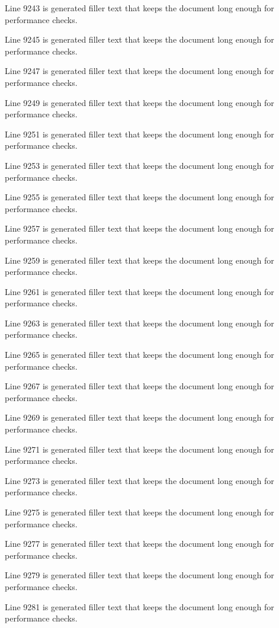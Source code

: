 Line 9243 is generated filler text that keeps the document long enough for performance checks.

Line 9245 is generated filler text that keeps the document long enough for performance checks.

Line 9247 is generated filler text that keeps the document long enough for performance checks.

Line 9249 is generated filler text that keeps the document long enough for performance checks.

Line 9251 is generated filler text that keeps the document long enough for performance checks.

Line 9253 is generated filler text that keeps the document long enough for performance checks.

Line 9255 is generated filler text that keeps the document long enough for performance checks.

Line 9257 is generated filler text that keeps the document long enough for performance checks.

Line 9259 is generated filler text that keeps the document long enough for performance checks.

Line 9261 is generated filler text that keeps the document long enough for performance checks.

Line 9263 is generated filler text that keeps the document long enough for performance checks.

Line 9265 is generated filler text that keeps the document long enough for performance checks.

Line 9267 is generated filler text that keeps the document long enough for performance checks.

Line 9269 is generated filler text that keeps the document long enough for performance checks.

Line 9271 is generated filler text that keeps the document long enough for performance checks.

Line 9273 is generated filler text that keeps the document long enough for performance checks.

Line 9275 is generated filler text that keeps the document long enough for performance checks.

Line 9277 is generated filler text that keeps the document long enough for performance checks.

Line 9279 is generated filler text that keeps the document long enough for performance checks.

Line 9281 is generated filler text that keeps the document long enough for performance checks.

